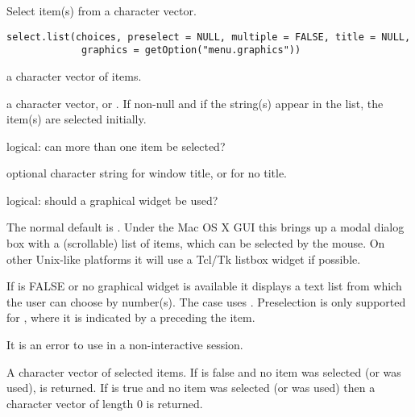 %
\begin{Description}\relax
Select item(s) from a character vector.
\end{Description}
%
\begin{Usage}
\begin{verbatim}
select.list(choices, preselect = NULL, multiple = FALSE, title = NULL,
             graphics = getOption("menu.graphics"))
\end{verbatim}
\end{Usage}
%
\begin{Arguments}
\begin{ldescription}
\item[\code{choices}] a character vector of items.
\item[\code{preselect}] a character vector, or .  If non-null and
if the string(s) appear in the list, the item(s) are selected
initially.
\item[\code{multiple}] logical: can more than one item be selected?
\item[\code{title}] optional character string for window title, or
 for no title.
\item[\code{graphics}] logical: should a graphical widget be used?
\end{ldescription}
\end{Arguments}
%
\begin{Details}\relax
The normal default is .
Under the Mac OS X GUI this brings up a modal dialog box
with a (scrollable) list of items, which can be selected by the mouse.
On other Unix-like platforms it will use a
Tcl/Tk listbox widget if possible.

If  is FALSE or no graphical widget is available it
displays a text list from which the user can choose by number(s). The
 case uses .  Preselection is
only supported for , where it is indicated by a
 preceding the item.

It is an error to use  in a non-interactive session. 
\end{Details}
%
\begin{Value}
A character vector of selected items.  If  is false and
no item was selected (or  was used),  is
returned.   If  is true and no item was selected (or
 was used) then a character vector of length 0 is returned.
\end{Value}
